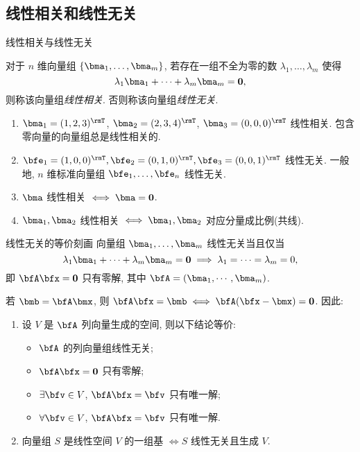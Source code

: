 \subsection{线性相关和线性无关}
\begin{frame}{线性相关与线性无关}
	\onslide<+->
	\begin{definition}
		对于 $n$ 维向量组 $\{\bma_1,\dots,\bma_m\}$,
		若存在一组\alert{不全为零}的数 $\lambda_1,\dots,\lambda_m$ 使得
		\[\lambda_1\bma_1+\dots+\lambda_m\bma_m={\bf0},\]
		则称该向量组\emph{线性相关}.
		否则称该向量组\emph{线性无关}.
	\end{definition}
	\onslide<+->
	\begin{example}
		\begin{enumerate}
			\item $\bma_1=(1,2,3)^\rmT$, $\bma_2=(2,3,4)^\rmT$, $\bma_3=(0,0,0)^\rmT$ 线性相关.
			\alert{包含零向量的向量组总是线性相关的}.
			\item $\bfe_1=(1,0,0)^\rmT,\bfe_2=(0,1,0)^\rmT,\bfe_3=(0,0,1)^\rmT$ 线性无关.
			一般地, \alert{$n$ 维标准向量组 $\bfe_1,\dots,\bfe_n$ 线性无关}.
			\item $\bma$ 线性相关 $\iff \bma={\bf0}$.
			\item $\bma_1,\bma_2$ 线性相关 $\iff \bma_1,\bma_2$ 对应分量成比例(共线).
		\end{enumerate}
	\end{example}
\end{frame}


\begin{frame}{线性无关的等价刻画}
	\onslide<+->
	向量组 $\bma_1,\dots,\bma_m$ 线性无关当且仅当
	\[\lambda_1\bma_1+\dots+\lambda_m\bma_m={\bf0}\implies
	\lambda_1=\cdots=\lambda_m=0,\]
	\onslide<+->
	即 $\bfA\bfx={\bf0}$ 只有零解, 其中 $\bfA=(\bma_1,\cdots,\bma_m)$.

	\onslide<+->
	若 $\bmb=\bfA\bmx$, 则 $\bfA\bfx=\bmb\iff \bfA(\bfx-\bmx)={\bf0}$.
	\onslide<+->
	因此:
	\begin{theorem}
		\begin{enumerate}
			\item 设 $V$ 是 $\bfA$ 列向量生成的空间, 则以下结论等价:
			\begin{itemize}
				\item $\bfA$ 的列向量组线性无关;
				\item $\bfA\bfx={\bf0}$ 只有零解;
				\item $\exists\bfv\in V$, $\bfA\bfx=\bfv$ 只有唯一解;
				\item $\forall\bfv\in V$, $\bfA\bfx=\bfv$ 只有唯一解.
			\end{itemize}
			\item 向量组 $S$ 是线性空间 $V$ 的一组基 $\iff S$ 线性无关且生成 $V$.
		\end{enumerate}
	\end{theorem}
\end{frame}


